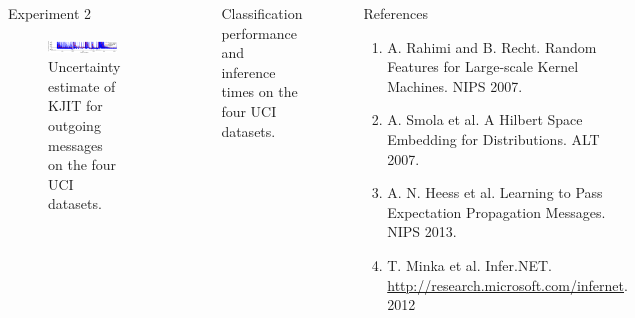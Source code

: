 \documentclass[english]{beamer}
\begin{document}
\begin{frame}
\begin{columns}[t]
\begin{block}{ Experiment 2}
\begin{figure}
\centering
\includegraphics[width=0.95\textwidth]{../uai2015/img/online/uci_temporal_uncertainty-crop}
\caption{
Uncertainty estimate of KJIT for outgoing messages on the four UCI datasets.
\label{fig:uci_temporal_uncertainty}
}
\end{figure}

\end{block}


\begin{figure}[ht]
  \centering
  \caption{Classification performance and inference times on the four UCI datasets. 
   }
  \label{fig:uci_performance}
\end{figure}


\begin{block}{References}

{\footnotesize
\begin{enumerate}
\item \justifying{} { A. Rahimi and B. Recht. Random Features
for Large-scale Kernel Machines. NIPS 2007.}
\item A. Smola et al. A Hilbert Space Embedding for Distributions. ALT 2007.
\item { A. N. Heess et al. Learning to Pass Expectation Propagation Messages.
NIPS 2013. }
\item T. Minka et al. Infer.NET. \url{http://research.microsoft.com/infernet}. 2012
\end{enumerate}
}

% 
% 


\end{block}



\end{columns}

\end{frame}
\end{document}
